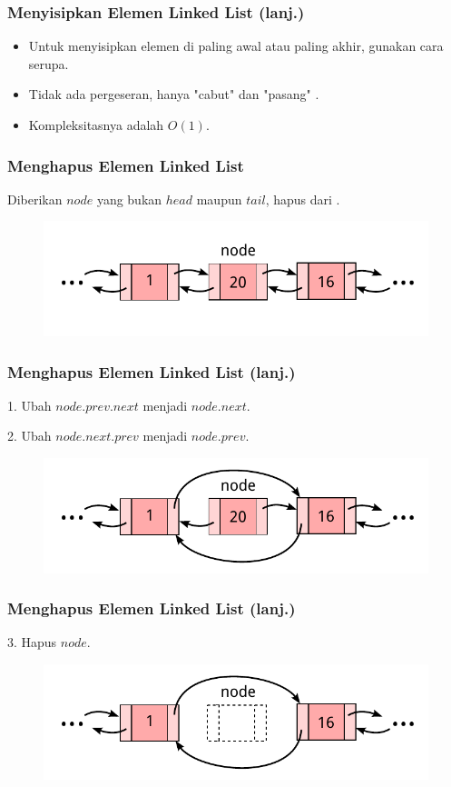 \begin{frame}
\frametitle{Menyisipkan Elemen Linked List (lanj.)}
\begin{itemize}
  \item Untuk menyisipkan elemen di paling awal atau paling akhir, gunakan cara serupa.
  \item Tidak ada pergeseran, hanya "cabut" dan "pasang" .
  \item Kompleksitasnya adalah $O(1)$.
\end{itemize}
\end{frame}

\begin{frame}
\frametitle{Menghapus Elemen Linked List}
Diberikan $node$ yang bukan $head$ maupun $tail$, hapus dari .
\begin{figure}
  \centering
  \includegraphics[width=9 cm]{asset/doubly-delete-1.pdf}
\end{figure}
\end{frame}

\begin{frame}
\frametitle{Menghapus Elemen Linked List (lanj.)}
1. Ubah $node.prev.next$ menjadi $node.next$.

2. Ubah $node.next.prev$ menjadi $node.prev$.
\begin{figure}
  \centering
  \includegraphics[width=9 cm]{asset/doubly-delete-2.pdf}
\end{figure}
\end{frame}

\begin{frame}
\frametitle{Menghapus Elemen Linked List (lanj.)}
3. Hapus $node$.
\begin{figure}
  \centering
  \includegraphics[width=9 cm]{asset/doubly-delete-3.pdf}
\end{figure}
\end{frame}

